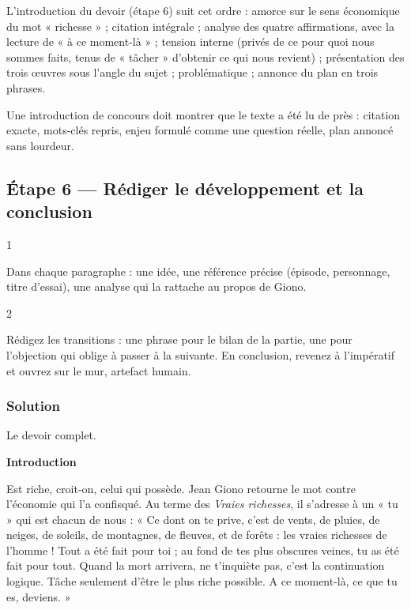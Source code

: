 \documentclass[11pt,a4paper]{article}
\begin{document}
L'introduction du devoir (étape 6) suit cet ordre : amorce sur le sens économique du mot « richesse » ; citation intégrale ; analyse des quatre affirmations, avec la lecture de « à ce moment-là » ; tension interne (privés de ce pour quoi nous sommes faits, tenus de « tâcher » d'obtenir ce qui nous revient) ; présentation des trois œuvres sous l'angle du sujet ; problématique ; annonce du plan en trois phrases.

\begin{jury}

Une introduction de concours doit montrer que le texte a été lu de près : citation exacte, mots-clés repris, enjeu formulé comme une question réelle, plan annoncé sans lourdeur.

\end{jury}

\hypertarget{uxe9tape-6-ruxe9diger-le-duxe9veloppement-et-la-conclusion}{%
\subsection{Étape 6 --- Rédiger le développement et la conclusion}\label{uxe9tape-6-ruxe9diger-le-duxe9veloppement-et-la-conclusion}}

\begin{indication}{1}

Dans chaque paragraphe : une idée, une référence précise (épisode, personnage, titre d'essai), une analyse qui la rattache au propos de Giono.

\end{indication}

\begin{indication}{2}

Rédigez les transitions : une phrase pour le bilan de la partie, une pour l'objection qui oblige à passer à la suivante. En conclusion, revenez à l'impératif et ouvrez sur le mur, artefact humain.

\end{indication}

\hypertarget{solution-5}{%
\subsubsection{Solution}\label{solution-5}}

Le devoir complet.

\textbf{Introduction}

Est riche, croit-on, celui qui possède. Jean Giono retourne le mot contre l'économie qui l'a confisqué. Au terme des \emph{Vraies richesses}, il s'adresse à un « tu » qui est chacun de nous : « Ce dont on te prive, c'est de vents, de pluies, de neiges, de soleils, de montagnes, de fleuves, et de forêts : les vraies richesses de l'homme ! Tout a été fait pour toi ; au fond de tes plus obscures veines, tu as été fait pour tout. Quand la mort arrivera, ne t'inquiète pas, c'est la continuation logique. Tâche seulement d'être le plus riche possible. A ce moment-là, ce que tu es, deviens. »
\end{document}

